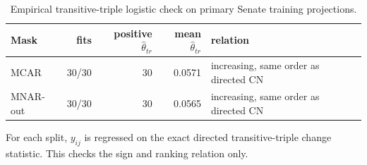 \begin{table}[tbp]
\centering
\small
\caption{Empirical transitive-triple logistic check on primary Senate training projections.}
\label{tab:mtt-check}
\begin{tabular}{lrrrl}
\toprule
Mask & fits & positive $\hat\theta_{tr}$ & mean $\hat\theta_{tr}$ & relation \\
\midrule
MCAR & 30/30 & 30 & 0.0571 & increasing, same order as directed CN \\
MNAR-out & 30/30 & 30 & 0.0565 & increasing, same order as directed CN \\
\bottomrule
\end{tabular}
\par\vspace{2pt}\footnotesize For each split, $y_{ij}$ is regressed on the exact directed transitive-triple change statistic. This checks the sign and ranking relation only.
\end{table}
